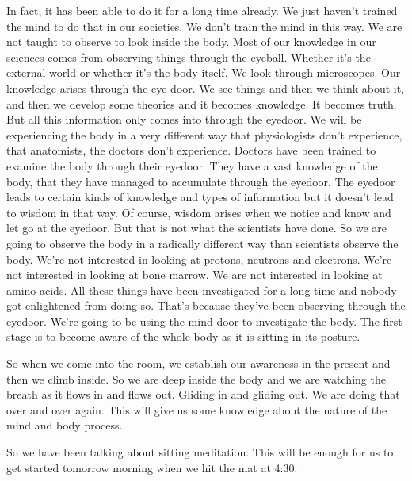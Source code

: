 \documentclass[letterpaper,10pt,english]{sphinxmanual}
\begin{document}
\sphinxAtStartPar
In fact, it has been able to do it for a long time already. We just haven’t
trained  the  mind  to  do  that  in  our  societies.  We  don’t  train  the  mind  in
this  way.  We  are  not  taught  to  observe  to  look  inside  the  body.  Most  of
our  knowledge  in  our  sciences  comes  from  observing  things  through  the
eyeball. Whether it’s the external world or whether it’s the body itself. We
look through microscopes. Our knowledge arises through the eye door. We
see things and then we think about it, and then we develop some theories
and it becomes knowledge. It becomes truth. But all this information only
comes  into  through  the  eye\sphinxhyphen{}door.  We  will  be  experiencing  the  body  in  a
very different way that physiologists don’t experience, that anatomists, the
  doctors  don’t  experience.  Doctors  have  been  trained  to  examine  the  body
through their eye\sphinxhyphen{}door. They have a vast knowledge of the body, that they
have  managed  to  accumulate  through  the  eye\sphinxhyphen{}door. The  eye\sphinxhyphen{}door  leads  to
certain kinds of knowledge and types of information but it doesn’t lead to
wisdom in that way. Of course, wisdom arises when we notice and know and
let go at the eye\sphinxhyphen{}door. But that is not what the scientists have done. So we are
going to observe the body in a radically different way than scientists observe
the body. We’re not interested in looking at protons, neutrons and electrons.
We’re  not  interested  in  looking  at  bone  marrow.  We  are  not  interested  in
looking at amino acids. All these things have been investigated for a long
time and nobody got enlightened from doing so. That’s because they’ve been
observing through the eye\sphinxhyphen{}door. We’re going to be using the mind door to
investigate the body. The first stage is to become aware of the whole body as
it is sitting in its posture.

\sphinxAtStartPar
So  when  we  come  into  the  room,  we  establish  our  awareness  in  the
present and then we climb inside. So we are deep inside the body and we are
watching the breath as it flows in and flows out. Gliding in and gliding out.
We are doing that over and over again. This will give us some knowledge
about the nature of the mind and body process.

\sphinxAtStartPar
So we have been talking about sitting meditation. This will be enough
for us to get started tomorrow morning when we hit the mat at 4:30.
\end{document}
